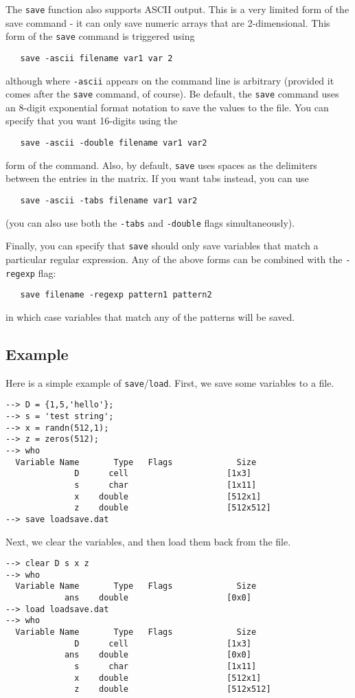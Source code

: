 The \verb|save| function also supports ASCII output.  This is a very limited
form of the save command - it can only save numeric arrays that are
2-dimensional.  This form of the \verb|save| command is triggered using
\begin{verbatim}
   save -ascii filename var1 var 2
\end{verbatim}
although where \verb|-ascii| appears on the command line is arbitrary (provided
it comes after the \verb|save| command, of course).  Be default, the \verb|save|
command uses an 8-digit exponential format notation to save the values to
the file.  You can specify that you want 16-digits using the
\begin{verbatim}
   save -ascii -double filename var1 var2
\end{verbatim}
form of the command.  Also, by default, \verb|save| uses spaces as the 
delimiters between the entries in the matrix.  If you want tabs instead,
you can use
\begin{verbatim}
   save -ascii -tabs filename var1 var2
\end{verbatim}
(you can also use both the \verb|-tabs| and \verb|-double| flags simultaneously).

Finally, you can specify that \verb|save| should only save variables that
match a particular regular expression.  Any of the above forms can be
combined with the \verb|-regexp| flag:
\begin{verbatim}
   save filename -regexp pattern1 pattern2
\end{verbatim}
in which case variables that match any of the patterns will be saved.
\subsection{Example}

Here is a simple example of \verb|save|/\verb|load|.  First, we save some 
variables to a file.
\begin{verbatim}
--> D = {1,5,'hello'};
--> s = 'test string';
--> x = randn(512,1);
--> z = zeros(512);
--> who
  Variable Name       Type   Flags             Size
              D      cell                    [1x3]
              s      char                    [1x11]
              x    double                    [512x1]
              z    double                    [512x512]
--> save loadsave.dat
\end{verbatim}
Next, we clear the variables, and then load them back from the file.
\begin{verbatim}
--> clear D s x z
--> who
  Variable Name       Type   Flags             Size
            ans    double                    [0x0]
--> load loadsave.dat
--> who
  Variable Name       Type   Flags             Size
              D      cell                    [1x3]
            ans    double                    [0x0]
              s      char                    [1x11]
              x    double                    [512x1]
              z    double                    [512x512]
\end{verbatim}
